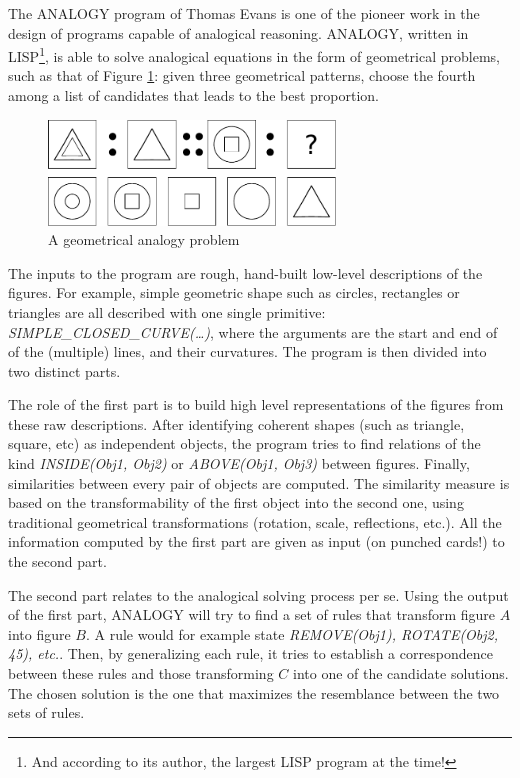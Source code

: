 The ANALOGY program of Thomas Evans \cite{Eva64} is one of the pioneer work in
the design of programs capable of analogical reasoning. ANALOGY, written in
LISP\footnote{And according to its author, the largest LISP program at the
time!}, is able to solve analogical equations in the form of geometrical
problems, such as that of Figure \ref{FIG:evans}: given three geometrical
patterns, choose the fourth among a list of candidates that leads to the best
proportion.

\begin{figure}[!h]
\centering
\includegraphics[width=3in]{figures/evans.pdf}
\caption{A geometrical analogy problem}
\label{FIG:evans}
\end{figure}

The inputs to the program are rough, hand-built low-level descriptions of the
figures. For example, simple geometric shape such as circles, rectangles or
triangles are all described with one single primitive:
\textit{SIMPLE\_CLOSED\_CURVE(\dots)}, where the arguments are the start and
end of of the (multiple) lines, and their curvatures. The program is then
divided into two distinct parts.

The role of the first part is to build high level representations of the
figures from these raw descriptions. After identifying coherent shapes (such as
triangle, square, etc) as independent objects, the program tries to find
relations of the kind \textit{INSIDE(Obj1, Obj2)} or \textit{ABOVE(Obj1, Obj3)}
between figures. Finally, similarities between every pair of objects are
computed. The similarity measure is based on the transformability of the first
object into the second one, using traditional geometrical transformations
(rotation, scale, reflections, etc.). All the information computed by the first
part are given as input (on punched cards!) to the second part.

The second part relates to the analogical solving process per se. Using the
output of the first part, ANALOGY will try to find a set of rules that
transform figure $A$ into figure $B$. A rule would for example state
\textit{REMOVE(Obj1), ROTATE(Obj2, 45\degree), etc.}. Then, by generalizing
each rule, it tries to establish a correspondence between these rules and those
transforming $C$ into one of the candidate solutions. The chosen solution is
the one that maximizes the resemblance between the two sets of rules.

